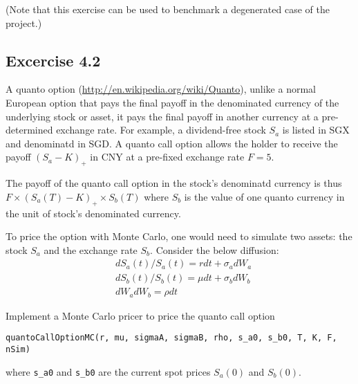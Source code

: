 \documentclass[12pt,a4paper,hidelinks,fleqn]{article}            %
\begin{document}
(Note that this exercise can be used to benchmark a degenerated case of the project.)
\subsection*{Excercise 4.2}
A quanto option (\url{http://en.wikipedia.org/wiki/Quanto}), unlike a normal European option that pays the final payoff in the denominated currency of the underlying stock or asset,
it pays the final payoff in another currency at a pre-determined exchange rate.
For example, a dividend-free stock $S_a$ is listed in SGX and denominatd in SGD. 
A quanto call option allows the holder to receive the payoff $(S_a-K)_+$ in CNY at a pre-fixed exchange rate $F = 5$. 

The payoff of the quanto call option in the stock's denominatd currency is thus 
$F \times (S_a(T)-K)_+ \times S_b(T)$ where $S_b$ is the value of one quanto currency in the unit of stock's denominated currency.

To price the option with Monte Carlo, one would need to simulate two assets: the stock $S_a$ and the exchange rate $S_b$.
Consider the below diffusion:
\begin{align}
& dS_a(t) / S_a(t) = r dt + \sigma_a dW_a \\
& dS_b(t) / S_b(t) = \mu dt + \sigma_b dW_b \\
& dW_a dW_b = \rho dt
\end{align}

Implement a Monte Carlo pricer to price the quanto call option
\begin{verbatim}
quantoCallOptionMC(r, mu, sigmaA, sigmaB, rho, s_a0, s_b0, T, K, F, nSim)
\end{verbatim}
where \verb=s_a0= and \verb=s_b0= are the current spot prices $S_a(0)$ and $S_b(0)$.
\end{document}
